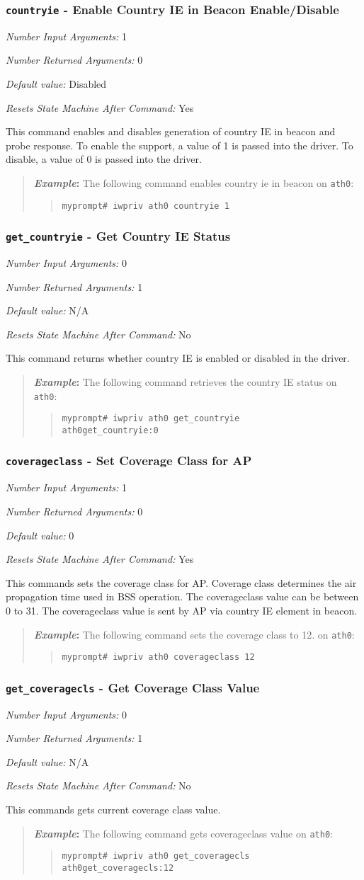 \documentclass[10pt,fullpage]{article}
\newcommand{\mytt}[1]{{\texttt{#1}}}
\newcommand{\bv}{\begin{verse}}
\newcommand{\ev}{\end{verse}}
\newcommand{\cmd}[1]{{\texttt{myprompt\# #1}}}
\newcommand{\argdesc}[4]{\begin{description}
\itemsep -6pt
\item \textit{Number Input Arguments:} #1
\item \textit{Number Returned Arguments:} #2
\item \textit{Default value:} #3
\item \textit{Resets State Machine After Command:} #4
\end{description}
}
\newenvironment{example}{\begin{quote}\textbf{\textit{Example}:}}{\end{quote}}
\begin{document}
\subsubsection{\mytt{countryie} - Enable Country IE in Beacon Enable/Disable}
\argdesc{1}{0}{Disabled}{Yes}
This command enables and disables generation of country IE in beacon and probe
response.  To enable the support, a value of 1 is passed into the driver. 
To disable, a value of 0 is passed into the driver.
\begin{example}
  The following command enables country ie in beacon  on \mytt{ath0}:
  \bv
  \cmd{iwpriv ath0 countryie 1}
  \ev
\end{example}

\subsubsection{\mytt{get\_countryie} - Get Country IE Status}
\argdesc{0}{1}{N/A}{No}
This command returns whether country IE is enabled or disabled in
the driver.
\begin{example}
  The following command retrieves the country IE status on \mytt{ath0}:
  \bv
  \cmd{iwpriv ath0 get\_countryie}\\
  \mytt{ath0\hspace{32pt}get\_countryie:0}
  \ev
\end{example}

\subsubsection{\mytt{coverageclass} - Set Coverage Class for AP}
\argdesc{1}{0}{0}{Yes}
This commands sets the coverage class for AP. Coverage class determines the
air propagation time used in BSS operation. The coverageclass value can be 
between 0 to 31. The coverageclass value is sent by AP via country IE
element in beacon.
\begin{example}
  The following command sets the coverage class to 12.
  on \mytt{ath0}:
  \bv
  \cmd{iwpriv ath0 coverageclass 12}\\
  \ev
\end{example}

\subsubsection{\mytt{get\_coveragecls} - Get Coverage Class Value}
\argdesc{0}{1}{N/A}{No}
This commands gets current coverage class value.
\begin{example}
  The following command gets coverageclass value
  on \mytt{ath0}:
  \bv
  \cmd{iwpriv ath0 get\_coveragecls}\\
  \mytt{ath0\hspace{32pt}get\_coveragecls:12}
  \ev
\end{example}
\end{document}
